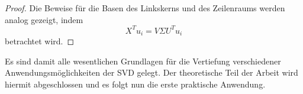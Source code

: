 \begin{proof}
    Die Beweise für die Basen des Linkskerns und des Zeilenraums werden analog gezeigt, indem
    \begin{equation*}
        X^{T}u_i = V \Sigma U^{T} u_i
    \end{equation*}
    betrachtet wird.
\end{proof}

Es sind damit alle wesentlichen Grundlagen für die Vertiefung verschiedener Anwendungsmöglichkeiten der SVD gelegt.
Der theoretische Teil der Arbeit wird hiermit abgeschlossen und es folgt nun die erste praktische Anwendung.

